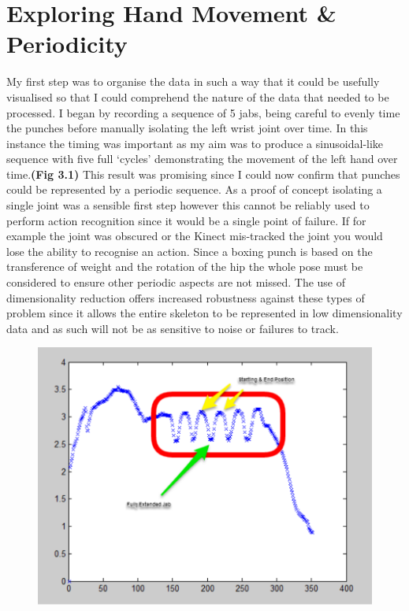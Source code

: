 \section{Exploring Hand Movement \& Periodicity}
My first step was to organise the data in such a way that it could be usefully visualised so that I could comprehend the nature of the data that needed to be processed. I began by recording a sequence of 5 jabs, being careful to evenly time the punches before manually isolating the left wrist joint over time. In this instance the timing was important as my aim was to produce a sinusoidal-like sequence with five full `cycles' demonstrating the movement of the left hand over time.{\bf(Fig 3.1)}
This result was promising since I could now confirm that punches could be represented by a periodic sequence. As a proof of concept isolating a single joint was a sensible first step however this cannot be reliably used to perform action recognition since it would be a single point of failure.  
If for example the joint was obscured or the Kinect mis-tracked the joint you would lose the ability to recognise an action. Since a boxing punch is based on the transference of weight and the rotation of the hip the whole pose must be considered to ensure other periodic aspects are not missed. The use of dimensionality reduction offers increased robustness against these types of problem since it allows the entire skeleton to be represented in low dimensionality data and as such will not be as sensitive to noise or failures to track. 

\begin{figure}[h]
    \centering
    \includegraphics[height=0.25\textheight]{fig04/lwrist.pdf}
\end{figure}


